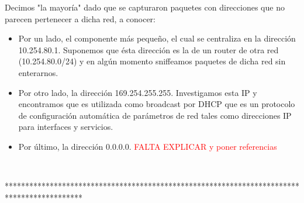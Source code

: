 Decimos "la mayoría" dado que se capturaron paquetes con direcciones que no 
parecen pertenecer a dicha red, a conocer:

\begin{itemize}
	\item Por un lado, el componente más pequeño, el cual se centraliza 
en la dirección 10.254.80.1. Suponemos que ésta dirección es la de un router
de otra red (10.254.80.0/24) y en algún momento sniffeamos paquetes de dicha 
red sin enterarnos.
	\item Por otro lado, la dirección 169.254.255.255. Investigamos esta
IP y encontramos que es utilizada como broadcast por DHCP que es un protocolo
de configuración automática de parámetros de red tales como direcciones IP
para interfaces y servicios.
	\item Por último, la dirección 0.0.0.0. \textcolor{red}{FALTA EXPLICAR y poner referencias}
\end{itemize} 


~


*******************************************************************************************


